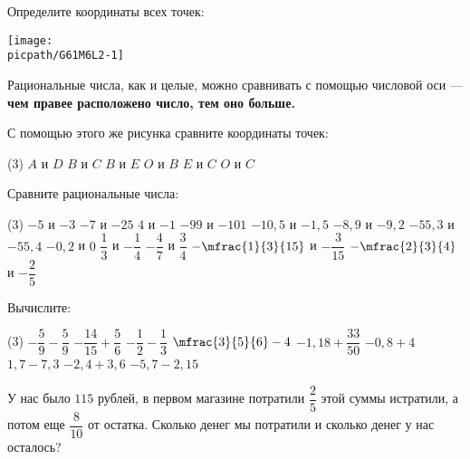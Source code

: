 \begin{class}[number=2]
	\begin{listofex}
		\item
		\begin{minipage}[t]{\bodywidth}
			Определите координаты всех точек:
		\end{minipage}
		\begin{minipage}[c]{0.45\textwidth}
			\texttt{[image: \\picpath/G61M6L2-1]}
		\end{minipage}
	\end{listofex}
	\begin{definit}
		Рациональные числа, как и целые, можно сравнивать с помощью числовой оси --- \textbf{чем правее расположено число, тем оно больше.}
	\end{definit}
	\begin{listofex}[resume]
		\item С помощью этого же рисунка сравните координаты точек:
		\begin{tasks}(3)
			\task \( A \) и \( D \)
			\task \( B \) и \( C \)
			\task \( B \) и \( E \)
			\task \( O \) и \( B \)
			\task \( E \) и \( C \)
			\task \( O \) и \( C \)
		\end{tasks}
		\item Сравните рациональные числа:
		\begin{tasks}(3)
			\task \( -5 \) и \( -3 \)
			\task \( -7 \) и \( -25 \)
			\task \( 4 \) и \( -1 \)
			\task \( -99 \) и \( -101 \)
			\task \( -10,5 \) и \( -1,5 \)
			\task \( -8,9 \) и \( -9,2 \)
			\task \( -55,3 \) и \( -55,4 \)
			\task \( -0,2 \) и \( 0 \)
			\task \( \dfrac{1}{3} \) и \( -\dfrac{1}{4} \)
			\task \(- \dfrac{4}{7} \) и \( \dfrac{3}{4} \)
			\task \(- \mfrac{1}{3}{15} \) и \( -\dfrac{3}{15} \)
			\task \( -\mfrac{2}{3}{4} \) и \( -\dfrac{2}{5} \)
		\end{tasks}
		\item Вычислите:
		\begin{tasks}(3)
			\task \( -\dfrac{5}{9}-\dfrac{5}{9} \)
			\task \( -\dfrac{14}{15}+\dfrac{5}{6} \)
			\task \( -\dfrac{1}{2}-\dfrac{1}{3} \)
			\task \( \mfrac{3}{5}{6}-4 \)
			\task \( -1,18+\dfrac{33}{50} \)
			\task \( -0,8+4 \)
			\task \( 1,7-7,3 \)
			\task \( -2,4+3,6 \)
			\task \( -5,7-2,15 \)
		\end{tasks}
		\item У нас было  \(115\)  рублей, в первом магазине потратили \(\dfrac{2}{5}\) этой суммы истратили, а потом еще \(\dfrac{8}{10}\) от остатка. Сколько денег мы потратили и сколько денег у нас осталось?

\end{listofex}
\end{class}
